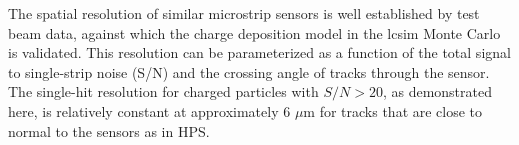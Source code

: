 The spatial resolution of similar microstrip sensors is well established by test beam data, against which the charge deposition model in the lcsim Monte Carlo is validated.  This resolution can be parameterized as a function of the total signal to single-strip noise (S/N) and the crossing angle of tracks through the sensor.  The single-hit resolution for charged particles with $S/N > 20$, as demonstrated here, is relatively constant at approximately 6 $\mu$m for tracks that are close to normal to the sensors as in HPS.

